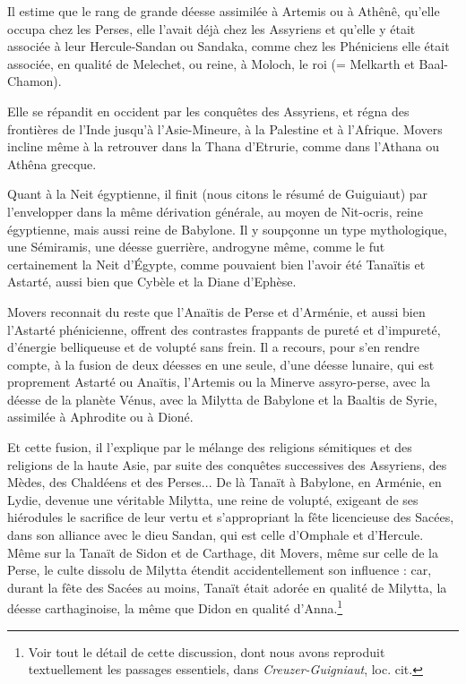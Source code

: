 \documentclass[a4paper, 11pt, oneside]{article}
\begin{document}
Il estime que le rang de grande déesse assimilée à Artemis ou à Athênê, qu'elle occupa chez les Perses, elle l'avait déjà chez les Assyriens et qu'elle y était associée à leur Hercule-Sandan ou Sandaka, comme chez les Phéniciens elle était associée, en qualité de Melechet, ou reine, à Moloch, le roi (= Melkarth et Baal-Chamon).

Elle se répandit en occident par les conquêtes des Assyriens, et régna des frontières de l'Inde jusqu'à l'Asie-Mineure, à la Palestine et à l'Afrique. Movers incline même à la retrouver dans la Thana d'Etrurie, comme dans l'Athana ou Athêna grecque.

Quant à la Neit égyptienne, il finit (nous citons le résumé de Guiguiaut) par l'envelopper dans la même dérivation générale, au moyen de Nit-ocris, reine égyptienne, mais aussi reine de Babylone. Il y soupçonne un type mythologique, une Sémiramis, une déesse guerrière, androgyne même, comme le fut certainement la Neit d'Égypte, comme pouvaient bien l'avoir été Tanaïtis et Astarté, aussi bien que Cybèle et la Diane d'Ephèse.

Movers reconnait du reste que l'Anaïtis de Perse et d'Arménie, et aussi bien l'Astarté phénicienne, offrent des contrastes frappants de pureté et d'impureté, d'énergie belliqueuse et de volupté sans frein. Il a recours, pour s'en rendre compte, à la fusion de deux déesses en une seule, d'une déesse lunaire, qui est proprement Astarté ou Anaïtis, l'Artemis ou la Minerve assyro-perse, avec la déesse de la planète Vénus, avec la Milytta de Babylone et la Baaltis de Syrie, assimilée à Aphrodite ou à Dioné.

Et cette fusion, il l'explique par le mélange des religions sémitiques et des religions de la haute Asie, par suite des conquêtes successives des Assyriens, des Mèdes, des Chaldéens et des Perses... De là Tanaït à Babylone, en Arménie, en Lydie, devenue une véritable Milytta, une reine de volupté, exigeant de ses hiérodules le sacrifice de leur vertu et s'appropriant la fête licencieuse des Sacées, dans son alliance avec le dieu Sandan, qui est celle d'Omphale et d'Hercule. Même sur la Tanaït de Sidon et de Carthage, dit Movers, même sur celle de la Perse, le culte dissolu de Milytta étendit accidentellement son influence : car, durant la fête des Sacées au moins, Tanaït était adorée en qualité de Milytta, la déesse carthaginoise, la même que Didon en qualité d'Anna.\footnote{Voir tout le détail de cette discussion, dont nous avons reproduit textuellement les passages essentiels, dans \emph{Creuzer-Guigniaut}, loc. cit.}
\end{document}
